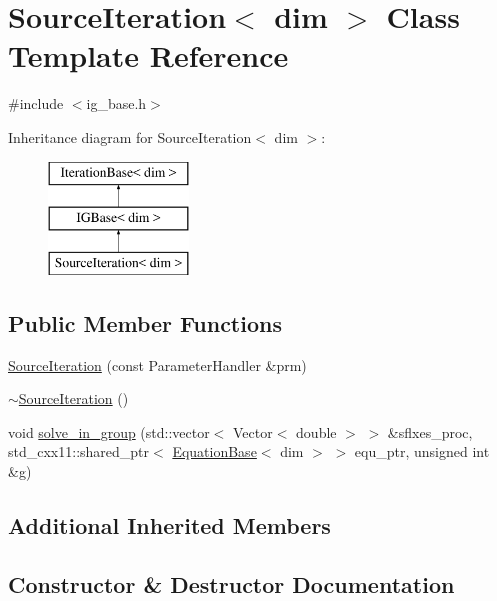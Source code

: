 \hypertarget{class_source_iteration}{}\section{Source\+Iteration$<$ dim $>$ Class Template Reference}
\label{class_source_iteration}


{\ttfamily \#include $<$ig\+\_\+base.\+h$>$}

Inheritance diagram for Source\+Iteration$<$ dim $>$\+:\begin{figure}[H]
\begin{center}
\leavevmode
\includegraphics[height=3.000000cm]{class_source_iteration}
\end{center}
\end{figure}
\subsection*{Public Member Functions}
\begin{DoxyCompactItemize}
\item 
\hyperlink{class_source_iteration_a50f7b38da2b8550f069386606026dc19}{Source\+Iteration} (const Parameter\+Handler \&prm)
\item 
\hyperlink{class_source_iteration_ae18057a8b8501d9e89b08ecfb33ef499}{$\sim$\+Source\+Iteration} ()
\item 
void \hyperlink{class_source_iteration_a6d726b9a581391cc4164c29f4ccd1ca5}{solve\+\_\+in\+\_\+group} (std\+::vector$<$ Vector$<$ double $>$ $>$ \&sflxes\+\_\+proc, std\+\_\+cxx11\+::shared\+\_\+ptr$<$ \hyperlink{class_equation_base}{Equation\+Base}$<$ dim $>$ $>$ equ\+\_\+ptr, unsigned int \&g)
\end{DoxyCompactItemize}
\subsection*{Additional Inherited Members}


\subsection{Constructor \& Destructor Documentation}
\mbox{\label{class_source_iteration_a50f7b38da2b8550f069386606026dc19}} 
